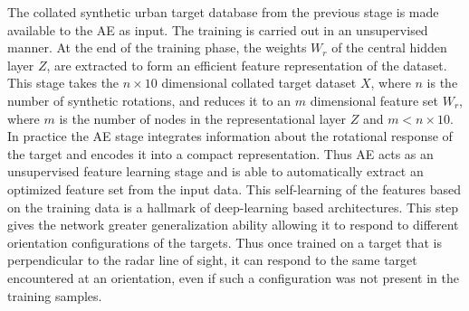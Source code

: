 The collated synthetic urban target database from the previous stage is made available to the AE as input. The training is carried out  in an unsupervised manner. At the end of the training phase, the weights $W_r$ of the central hidden layer $Z$, are extracted to form an efficient feature representation of the dataset. This stage takes the $n\times10$ dimensional collated target dataset $X$, where $n$ is the number of synthetic rotations, and reduces it to an $m$ dimensional feature set $W_r$, where $m$ is the number of nodes in the representational layer $Z$ and $m < n\times10$. In practice the AE stage integrates information about the rotational response of the target and encodes it into a compact representation. Thus AE acts as an unsupervised feature learning stage and is able to automatically extract an optimized feature set from the input data. This self-learning of the features based on the training data is a hallmark of deep-learning based architectures. This step gives the network  greater generalization ability allowing it to respond to different orientation configurations of the targets. Thus once trained on a target that is  perpendicular to the radar line of sight, it can respond to the same target encountered at an orientation, even if such a configuration was not present in the training samples. %

